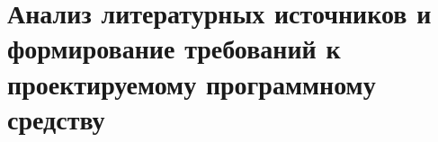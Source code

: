 \section{Анализ литературных источников и формирование
требований к проектируемому программному средству}
\label{sec:analysis}

\setcounter{page}{7}